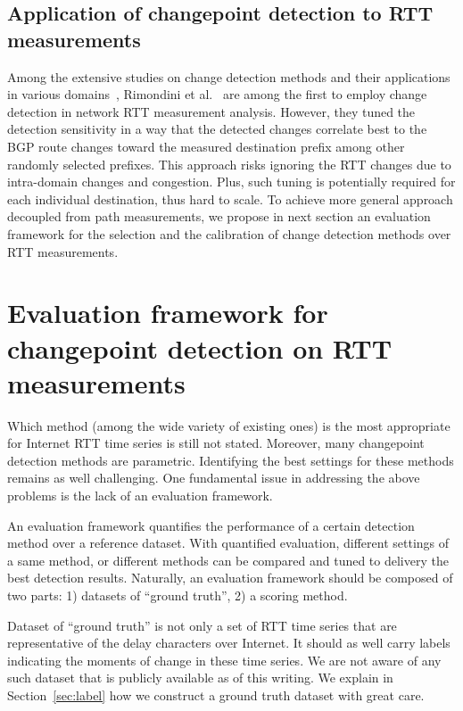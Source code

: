 \subsection{Application of changepoint detection to RTT measurements}
Among the extensive studies on change detection methods and their applications in various domains~\cite{Zhang2007,Reeves2007, Yu2008},
Rimondini et al.~\cite{Rimondini2014} are among the first to employ change detection in network RTT measurement analysis.
However, they tuned the detection sensitivity in a way that the detected changes correlate best to the BGP route changes toward the measured destination prefix among other randomly selected prefixes.
This approach risks ignoring the RTT changes due to intra-domain changes and congestion.
Plus, such tuning is potentially required for each individual destination, thus hard to scale.
To achieve more general approach decoupled from path measurements, we propose in next section an evaluation framework for the selection and the calibration of change detection methods over RTT measurements.


\section{Evaluation framework for changepoint detection on RTT measurements}
\label{sec:eval_frame}
Which method (among the wide variety of existing ones) is the most appropriate for Internet RTT time series is still not stated. 
Moreover, many changepoint detection methods are parametric. 
Identifying the best settings for these methods remains as well challenging.
One fundamental issue in addressing the above problems is the lack of an evaluation framework.

An evaluation framework quantifies the performance of a certain detection method over a reference dataset.
With quantified evaluation, different settings of a same method, or different methods can be compared and tuned to delivery the best detection results.
Naturally, an evaluation framework should be composed of two parts: 1) datasets of ``ground truth'', 2) a scoring method.

Dataset of ``ground truth'' is not only a set of RTT time series that are representative of the delay characters over Internet.
It should as well carry labels indicating the moments of change in these time series.
We are not aware of any such dataset that is publicly available as of this writing.
We explain in Section~\ref{sec:label} how we construct a ground truth dataset with great care.

